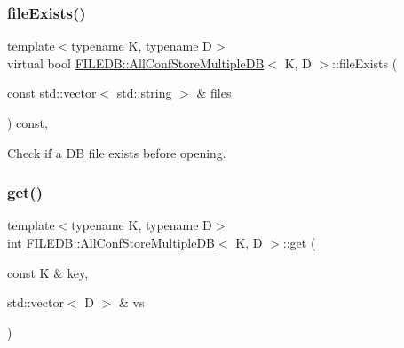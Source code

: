 \subsubsection{\texorpdfstring{fileExists()}{fileExists()}\hspace{0.1cm}{\footnotesize\ttfamily [2/2]}}
{\footnotesize\ttfamily template$<$typename K, typename D$>$ \\
virtual bool \mbox{\hyperlink{classFILEDB_1_1AllConfStoreMultipleDB}{F\+I\+L\+E\+D\+B\+::\+All\+Conf\+Store\+Multiple\+DB}}$<$ K, D $>$\+::file\+Exists (\begin{DoxyParamCaption}\item[{const std\+::vector$<$ std\+::string $>$ \&}]{files }\end{DoxyParamCaption}) const\hspace{0.3cm}{\ttfamily [inline]}, {\ttfamily [virtual]}}

Check if a DB file exists before opening. \mbox{\label{classFILEDB_1_1AllConfStoreMultipleDB_a3a9858458bf0ecc76133e1c448568cf5}} 
\subsubsection{\texorpdfstring{get()}{get()}\hspace{0.1cm}{\footnotesize\ttfamily [1/2]}}
{\footnotesize\ttfamily template$<$typename K, typename D$>$ \\
int \mbox{\hyperlink{classFILEDB_1_1AllConfStoreMultipleDB}{F\+I\+L\+E\+D\+B\+::\+All\+Conf\+Store\+Multiple\+DB}}$<$ K, D $>$\+::get (\begin{DoxyParamCaption}\item[{const K \&}]{key,  }\item[{std\+::vector$<$ D $>$ \&}]{vs }\end{DoxyParamCaption})\hspace{0.3cm}{\ttfamily [inline]}}


